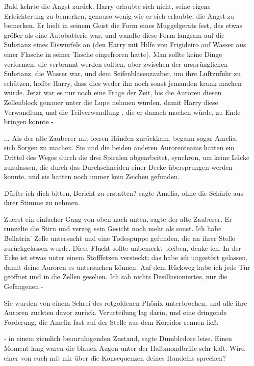 Bald kehrte die Angst zurück. Harry erlaubte sich nicht, seine eigene
Erleichterung zu bemerken, genauso wenig wie er sich erlaubte, die Angst zu
bemerken. Er hielt in seinem Geist die Form eines Muggelgeräts fest, das etwas
größer als eine Autobatterie war, und wandte diese Form langsam auf die Substanz
eines Eiswürfels an (den Harry mit Hilfe von Frigideiro auf Wasser aus einer
Flasche in seiner Tasche eingefroren hatte). Man sollte keine Dinge verformen,
die verbrannt werden sollten, aber zwischen der ursprünglichen Substanz, die
Wasser war, und dem Seifenblasenzauber, um ihre Luftzufuhr zu schützen, hoffte
Harry, dass dies weder ihn noch sonst jemanden krank machen würde. Jetzt war es
nur noch eine Frage der Zeit, bis die Auroren diesen Zellenblock genauer unter
die Lupe nehmen würden, damit Harry diese Verwandlung und die Teilverwandlung ,
die er danach machen würde, zu Ende bringen konnte -

... Als der alte Zauberer mit leeren Händen zurückkam, begann sogar Amelia, sich
Sorgen zu machen. Sie und die beiden anderen Aurorenteams hatten ein Drittel des
Weges durch die drei Spiralen abgearbeitet, synchron, um keine Lücke zuzulassen,
die durch das Durchschneiden einer Decke übersprungen werden konnte, und sie
hatten noch immer kein Zeichen gefunden.

\glqq{}Dürfte ich dich bitten, Bericht zu erstatten?\grqq{} sagte Amelia, ohne
die Schärfe aus ihrer Stimme zu nehmen.

\glqq{}Zuerst ein einfacher Gang von oben nach unten\grqq{}, sagte der alte
Zauberer. Er runzelte die Stirn und verzog sein Gesicht noch mehr als sonst.
\glqq{}Ich habe Bellatrix' Zelle untersucht und eine Todespuppe gefunden, die an
ihrer Stelle zurückgelassen wurde. Diese Flucht sollte unbemerkt bleiben, denke
ich. In der Ecke ist etwas unter einem Stofffetzen versteckt; das habe ich
ungestört gelassen, damit deine Auroren es untersuchen können. Auf dem Rückweg
habe ich jede Tür geöffnet und in die Zellen gesehen. Ich sah nichts
Desillusioniertes, nur die Gefangenen -\grqq{}

Sie wurden von einem Schrei des rotgoldenen Phönix unterbrochen, und alle ihre
Auroren zuckten davor zurück. Verurteilung lag darin, und eine dringende
Forderung, die Amelia fast auf der Stelle aus dem Korridor rennen ließ.

\glqq{}- in einem ziemlich beunruhigenden Zustand\grqq{}, sagte Dumbledore leise.
Einen Moment lang waren die blauen Augen unter der Halbmondbrille sehr kalt.
\glqq{}Wird einer von euch mit mir über die Konsequenzen deines Handelns
sprechen?\grqq{}

